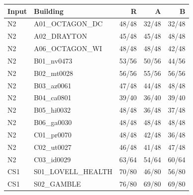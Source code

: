\begin{tabular}{llrrr}
\toprule
Input & Building & R & A & B \\
\midrule
N2 & A01\_OCTAGON\_DC & 48/48 & 32/48 & 32/48 \\
N2 & A02\_DRAYTON & 45/48 & 45/48 & 48/48 \\
N2 & A06\_OCTAGON\_WI & 48/48 & 48/48 & 42/48 \\
N2 & B01\_nv0473 & 53/56 & 50/56 & 44/56 \\
N2 & B02\_mt0028 & 56/56 & 55/56 & 56/56 \\
N2 & B03\_az0061 & 47/48 & 44/48 & 48/48 \\
N2 & B04\_ca0801 & 39/40 & 36/40 & 39/40 \\
N2 & B05\_hi0032 & 48/48 & 36/48 & 37/48 \\
N2 & B06\_ga0030 & 48/48 & 48/48 & 48/48 \\
N2 & C01\_pr0070 & 48/48 & 42/48 & 36/48 \\
N2 & C02\_ut0027 & 46/48 & 41/48 & 47/48 \\
N2 & C03\_id0029 & 63/64 & 54/64 & 60/64 \\
CS1 & S01\_LOVELL\_HEALTH & 70/80 & 46/80 & 56/80 \\
CS1 & S02\_GAMBLE & 76/80 & 69/80 & 69/80 \\
\bottomrule
\end{tabular}

